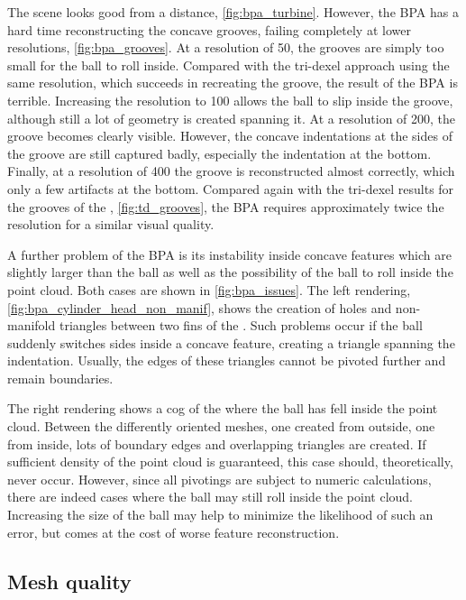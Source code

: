 The \turbine scene looks good from a distance, \cf \cref{fig:bpa_turbine}.
However, the BPA has a hard time reconstructing the concave grooves, failing completely at lower resolutions, \cf \cref{fig:bpa_grooves}.
At a resolution of 50, the grooves are simply too small for the ball to roll inside.
Compared with the tri-dexel approach using the same resolution, which succeeds in recreating the groove, the result of the BPA is terrible.
Increasing the resolution to 100 allows the ball to slip inside the groove, although still a lot of geometry is created spanning it.
At a resolution of 200, the groove becomes clearly visible.
However, the concave indentations at the sides of the groove are still captured badly, especially the indentation at the bottom.
Finally, at a resolution of 400 the groove is reconstructed almost correctly, which only a few artifacts at the bottom.
Compared again with the tri-dexel results for the grooves of the \turbine, \cf \cref{fig:td_grooves}, the BPA requires approximately twice the resolution for a similar visual quality.

A further problem of the BPA is its instability inside concave features which are slightly larger than the ball as well as the possibility of the ball to roll inside the point cloud.
Both cases are shown in \cref{fig:bpa_issues}.
The left rendering, \cref{fig:bpa_cylinder_head_non_manif}, shows the creation of holes and non-manifold triangles between two fins of the \cylinderhead.
Such problems occur if the ball suddenly switches sides inside a concave feature, creating a triangle spanning the indentation.
Usually, the edges of these triangles cannot be pivoted further and remain boundaries.

The right rendering shows a cog of the \turbine where the ball has fell inside the point cloud.
Between the differently oriented meshes, one created from outside, one from inside, lots of boundary edges and overlapping triangles are created.
If sufficient density of the point cloud is guaranteed, this case should, theoretically, never occur.
However, since all pivotings are subject to numeric calculations, there are indeed cases where the ball may still roll inside the point cloud.
Increasing the size of the ball may help to minimize the likelihood of such an error, but comes at the cost of worse feature reconstruction.


\subsection{Mesh quality}


